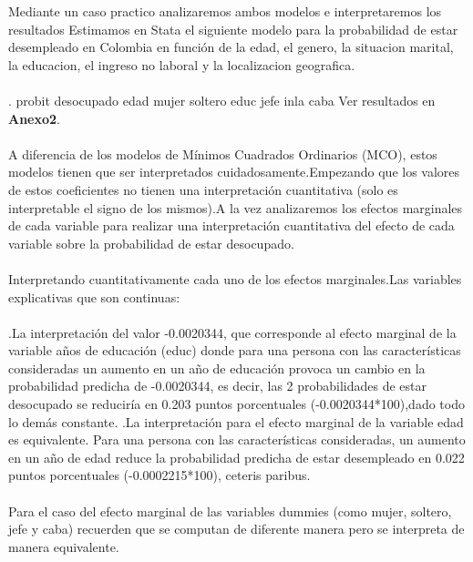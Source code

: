 \documentclass[11pt,fleqn]{book} %
\numberwithin{equation}{section} %
\numberwithin{figure}{section} %
\numberwithin{table}{section} %
\begin{document}
Mediante un caso practico analizaremos ambos modelos e interpretaremos los resultados
Estimamos en Stata el siguiente modelo para la probabilidad de estar
desempleado en Colombia en función de la edad, el genero, la situacion marital, la educacion, el ingreso no laboral y la localizacion geografica.
\\\\
. probit desocupado edad mujer soltero educ jefe inla caba 
Ver resultados en \textbf{Anexo2}.
\\\\
A diferencia de los modelos de Mínimos Cuadrados Ordinarios (MCO), estos modelos tienen que ser interpretados cuidadosamente.Empezando que los valores de estos coeficientes no tienen una interpretación cuantitativa (solo es interpretable el signo de los mismos).A la vez analizaremos los efectos marginales de cada variable para realizar una interpretación cuantitativa del efecto de cada variable sobre la probabilidad de estar desocupado.
\\\\
Interpretando cuantitativamente cada uno de los efectos
marginales.Las variables explicativas que son continuas:
\\\\
.La interpretación del valor -0.0020344, que corresponde al efecto marginal de la variable años de educación (educ) donde para una persona con las características consideradas un aumento en un año de
educación provoca un cambio en la probabilidad predicha de -0.0020344, es decir, las 2 probabilidades de estar desocupado se reduciría en 0.203 puntos porcentuales (-0.0020344*100),dado todo lo demás constante.
.La interpretación para el efecto marginal de la variable edad es equivalente. Para una persona con las características consideradas, un aumento en un año de edad reduce la probabilidad
predicha de estar desempleado en 0.022 puntos porcentuales (-0.0002215*100), ceteris paribus.
\\\\
Para el caso del efecto marginal de las variables dummies (como mujer, soltero, jefe y caba) recuerden que se computan de diferente manera pero se interpreta de manera equivalente.
\end{document}
